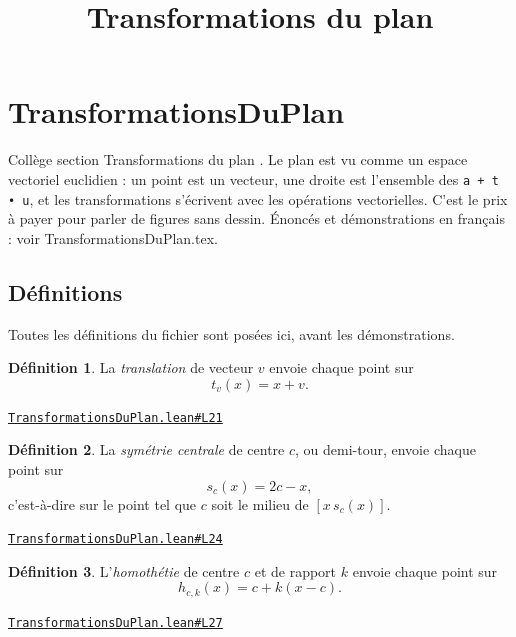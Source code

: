 \documentclass[11pt,a4paper]{article}
\title{Transformations du plan}
\date{}
\theoremstyle{definition}
\newtheorem{definition}{Définition}
\theoremstyle{plain}
\newcommand{\source}[2]{\par\smallskip\noindent\hfill{\footnotesize\href{#1}{\texttt{#2}}}\par\smallskip}
\begin{document}
\maketitle
\sloppy

\section{TransformationsDuPlan}

\noindent
Collège \textemdash{} section \og{} Transformations du plan \fg{}.
Le plan est vu comme un espace vectoriel euclidien : un point est un vecteur, une droite
est l'ensemble des \texttt{a + t • u}, et les transformations s'écrivent avec les opérations
vectorielles. C'est le prix à payer pour parler de figures sans dessin.
Énoncés et démonstrations en français : voir TransformationsDuPlan.tex.

\subsection{Définitions}

\noindent
Toutes les définitions du fichier sont posées ici, avant les démonstrations.

\begin{definition}
La \emph{translation} de vecteur $v$ envoie chaque point sur
\[ t_v(x) = x + v . \]
\end{definition}
\source{https://github.com/Commutator-IO/learn-lean/blob/main/courses/01-college/03-transformations-du-plan/TransformationsDuPlan.lean\#L21}{TransformationsDuPlan.lean\#L21}

\begin{definition}
La \emph{symétrie centrale} de centre $c$, ou demi-tour, envoie chaque point sur
\[ s_c(x) = 2c - x , \]
c'est-à-dire sur le point tel que $c$ soit le milieu de $[x\,s_c(x)]$.
\end{definition}
\source{https://github.com/Commutator-IO/learn-lean/blob/main/courses/01-college/03-transformations-du-plan/TransformationsDuPlan.lean\#L24}{TransformationsDuPlan.lean\#L24}

\begin{definition}
L'\emph{homothétie} de centre $c$ et de rapport $k$ envoie chaque point sur
\[ h_{c,k}(x) = c + k(x - c) . \]
\end{definition}
\source{https://github.com/Commutator-IO/learn-lean/blob/main/courses/01-college/03-transformations-du-plan/TransformationsDuPlan.lean\#L27}{TransformationsDuPlan.lean\#L27}
\end{document}

